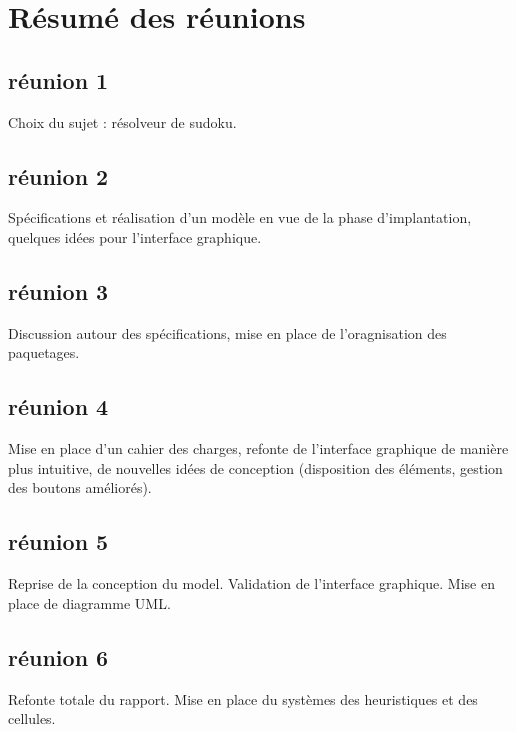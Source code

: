 \section{Résumé des réunions}

\subsection{réunion 1}
Choix du sujet : résolveur de sudoku.

\subsection{réunion 2}
Spécifications et réalisation d'un modèle 
en vue de la phase d'implantation, 
quelques idées pour l'interface graphique.

\subsection{réunion 3}
Discussion autour des spécifications, 
mise en place de l'oragnisation des paquetages.

\subsection{réunion 4}
Mise en place d'un cahier des charges, 
refonte de l'interface graphique de manière plus intuitive, 
de nouvelles idées de conception 
(disposition des éléments, gestion des boutons améliorés). 

\subsection{réunion 5}
Reprise de la conception du model.\newline
Validation de l'interface graphique.\newline
Mise en place de diagramme UML.

\subsection{réunion 6}
Refonte totale du rapport.
Mise en place du systèmes des heuristiques et des cellules.
